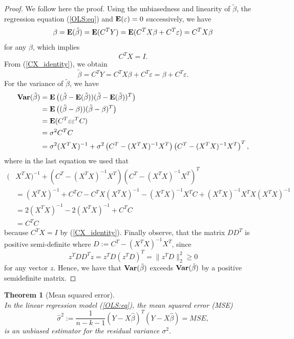 \documentclass[a4paper, 12pt]{scrreprt}
\newtheorem{Theorem}{Theorem}[chapter]
\newcommand{\ew}{\mbox{\textbf{E}}}
\newcommand{\var}{\mbox{\textbf{Var}}}
\newcommand{\norm}{\|}
\begin{document}
\begin{proof} We follow here the proof.
Using the unbiasedness and linearity of $\tilde{\beta}$, the regression equation (\ref{OLS:eq}) and $\ew(\varepsilon) = 0$ successively, we have
\begin{equation}
\beta = \ew(\tilde{\beta}) = \ew(C^T Y) = \ew(C^T X \beta + C^T \varepsilon ) = C^T X \beta
\end{equation}
for any $\beta$, which implies
\begin{equation}\label{CX_identity}
C^T X = I.
\end{equation}
From (\ref{CX_identity}), we obtain
\begin{equation}\label{beta_tilde}
\tilde{\beta} = C^T Y = C^T X \beta + C^T \varepsilon = \beta + C^T \varepsilon.
\end{equation}
For the variance of $\tilde{\beta}$, we have
\begin{align*}
\var(\tilde{\beta}) &= \ew\left(  (\tilde{\beta} - \ew(\tilde{\beta}))(\tilde{\beta} - \ew(\tilde{\beta}))^T  \right)  \\
&= \ew\left(  (\tilde{\beta} - \beta))(\tilde{\beta} - \beta)^T  \right) \\
&= \ew(C^T \varepsilon \varepsilon^T C) \\ 
&= \sigma^2 C^T C \\
&= \sigma^2 (X^T X)^{-1} + \sigma^2 \left( C^T - (X^T X)^{-1} X^T \right) \left( C^T - (X^T X)^{-1} X^T \right)^T,
\end{align*}
where in the last equation we used that 
\begin{align*}
(&X^T X)^{-1} + \left( C^T - (X^T X)^{-1} X^T \right) \left( C^T - (X^T X)^{-1} X^T \right)^T \\ 
&= (X^T X)^{-1} + C^T C - C^T X(X^T X)^{-1} - (X^T X)^{-1} X^T C + (X^T X)^{-1} X^T X (X^T X)^{-1} \\
&= 2(X^T X)^{-1} - 2(X^T X)^{-1}  +  C^T C \\
&= C^T C
\end{align*}
because $C^T X = I$ by (\ref{CX_identity}).
Finally observe, that the matrix $DD^T$ is positive semi-definite where $D:=  C^T - (X^T X)^{-1} X^T$, since 
\[ z^T D D^T z = z^T D (z^T D)^T = \norm z^T D \norm_2^2 \geq 0 \]
for any vector $z$. Hence, we have that $\var(\tilde{\beta})$ exceeds $\var(\hat{\beta})$ by a positive semidefinite matrix.
\end{proof}

\begin{Theorem}[Mean squared error] \label{MSE} $\text{ }$ \\ \upshape
In the linear regression model (\ref{OLS:eq}), the mean squared error (MSE) 
\begin{equation}\label{sigmahat}
\hat{\sigma}^2 := \frac{1}{n-k-1} (Y-X \hat{\beta})^T (Y-X\hat{\beta}) = MSE,
\end{equation}
is an unbiased estimator for the residual variance $\sigma^2$.
\end{Theorem}
\end{document}

